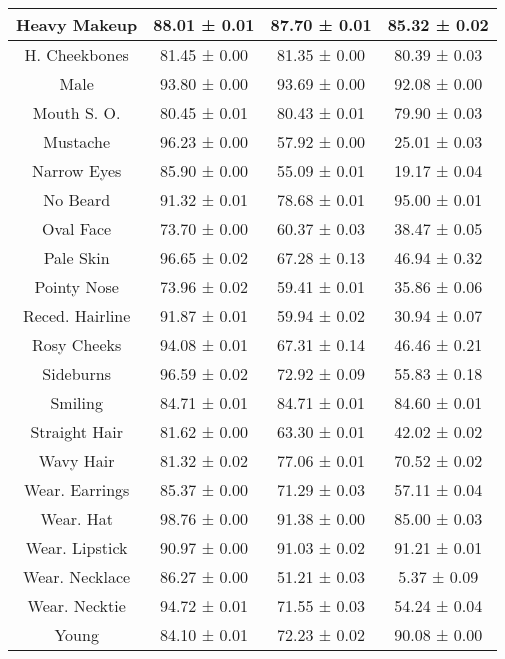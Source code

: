 \begin{table*}[h]
{\begin{tabular}{|c|c|c|c|}
Heavy Makeup       & 88.01 ± 0.01 & 87.70 ± 0.01 & 85.32 ± 0.02 \\ \hline
H. Cheekbones      & 81.45 ± 0.00 & 81.35 ± 0.00 & 80.39 ± 0.03 \\ \hline
Male               & 93.80 ± 0.00 & 93.69 ± 0.00 & 92.08 ± 0.00 \\ \hline
Mouth S. O.        & 80.45 ± 0.01 & 80.43 ± 0.01 & 79.90 ± 0.03 \\ \hline
Mustache           & 96.23 ± 0.00 & 57.92 ± 0.00 & 25.01 ± 0.03 \\ \hline
Narrow Eyes        & 85.90 ± 0.00 & 55.09 ± 0.01 & 19.17 ± 0.04 \\ \hline
No Beard           & 91.32 ± 0.01 & 78.68 ± 0.01 & 95.00 ± 0.01 \\ \hline
Oval Face          & 73.70 ± 0.00 & 60.37 ± 0.03 & 38.47 ± 0.05 \\ \hline
Pale Skin          & 96.65 ± 0.02 & 67.28 ± 0.13 & 46.94 ± 0.32 \\ \hline
Pointy Nose        & 73.96 ± 0.02 & 59.41 ± 0.01 & 35.86 ± 0.06 \\ \hline
Reced. Hairline    & 91.87 ± 0.01 & 59.94 ± 0.02 & 30.94 ± 0.07 \\ \hline
Rosy Cheeks        & 94.08 ± 0.01 & 67.31 ± 0.14 & 46.46 ± 0.21 \\ \hline
Sideburns          & 96.59 ± 0.02 & 72.92 ± 0.09 & 55.83 ± 0.18 \\ \hline
Smiling            & 84.71 ± 0.01 & 84.71 ± 0.01 & 84.60 ± 0.01 \\ \hline
Straight Hair      & 81.62 ± 0.00 & 63.30 ± 0.01 & 42.02 ± 0.02 \\ \hline
Wavy Hair          & 81.32 ± 0.02 & 77.06 ± 0.01 & 70.52 ± 0.02 \\ \hline
Wear. Earrings     & 85.37 ± 0.00 & 71.29 ± 0.03 & 57.11 ± 0.04 \\ \hline
Wear. Hat          & 98.76 ± 0.00 & 91.38 ± 0.00 & 85.00 ± 0.03 \\ \hline
Wear. Lipstick     & 90.97 ± 0.00 & 91.03 ± 0.02 & 91.21 ± 0.01 \\ \hline
Wear. Necklace     & 86.27 ± 0.00 & 51.21 ± 0.03 & 5.37 ± 0.09 \\ \hline
Wear. Necktie      & 94.72 ± 0.01 & 71.55 ± 0.03 & 54.24 ± 0.04 \\ \hline
Young              & 84.10 ± 0.01 & 72.23 ± 0.02 & 90.08 ± 0.00 \\ \hline
\end{tabular}
}
\vskip -0.1in
\end{table*}


